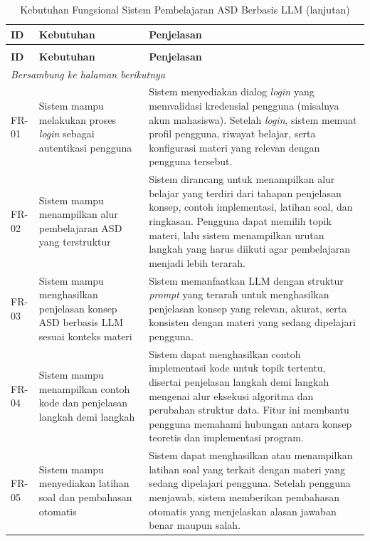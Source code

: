 \begin{longtable}{|p{1.8cm}|p{3cm}|p{7.5cm}|}
\caption{Kebutuhan Fungsional Sistem Pembelajaran ASD Berbasis LLM}
\label{tab:fr-llm}\\
\hline
\textbf{ID} & \textbf{Kebutuhan} & \textbf{Penjelasan} \\
\hline
\endfirsthead

\caption[]{Kebutuhan Fungsional Sistem Pembelajaran ASD Berbasis LLM (lanjutan)}\\
\hline
\textbf{ID} & \textbf{Kebutuhan} & \textbf{Penjelasan} \\
\hline
\endhead

\hline
\multicolumn{3}{l}{\textit{Bersambung ke halaman berikutnya}}\\
\endfoot

\hline
\endlastfoot

FR-01 & Sistem mampu melakukan proses \textit{login} sebagai autentikasi pengguna &
Sistem menyediakan dialog \textit{login} yang memvalidasi kredensial pengguna (misalnya akun mahasiswa). Setelah \textit{login}, sistem memuat profil pengguna, riwayat belajar, serta konfigurasi materi yang relevan dengan pengguna tersebut. \\
\hline

FR-02 & Sistem mampu menampilkan alur pembelajaran ASD yang terstruktur &
Sistem dirancang untuk menampilkan alur belajar yang terdiri dari tahapan penjelasan konsep, contoh implementasi, latihan soal, dan ringkasan. Pengguna dapat memilih topik materi, lalu sistem menampilkan urutan langkah yang harus diikuti agar pembelajaran menjadi lebih terarah. \\
\hline

FR-03 & Sistem mampu menghasilkan penjelasan konsep ASD berbasis LLM sesuai konteks materi &
Sistem memanfaatkan LLM dengan struktur \textit{prompt} yang terarah untuk menghasilkan penjelasan konsep yang relevan, akurat, serta konsisten dengan materi yang sedang dipelajari pengguna. \\
\hline

FR-04 & Sistem mampu menampilkan contoh kode dan penjelasan langkah demi langkah &
Sistem dapat menghasilkan contoh implementasi kode untuk topik tertentu, disertai penjelasan langkah demi langkah mengenai alur eksekusi algoritma dan perubahan struktur data. Fitur ini membantu pengguna memahami hubungan antara konsep teoretis dan implementasi program. \\
\hline

FR-05 & Sistem mampu menyediakan latihan soal dan pembahasan otomatis &
Sistem dapat menghasilkan atau menampilkan latihan soal yang terkait dengan materi yang sedang dipelajari pengguna. Setelah pengguna menjawab, sistem memberikan pembahasan otomatis yang menjelaskan alasan jawaban benar maupun salah. \\
\hline


\end{longtable}
